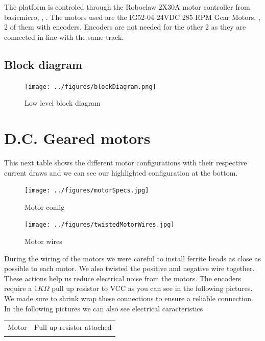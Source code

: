 \documentclass[12pt,letterpaper,oneside]{article}
\begin{document}
The platform is controled through the Roboclaw 2X30A motor controller from basicmicro, \cite{Roboclaw}, \cite{RoboclawData,RoboclawManual}. The motors used are the IG52-04 24VDC 285 RPM Gear Motors, \cite{EncMotors,RegMotors}, 2 of them with encoders. Encoders are not needed for the other 2 as they are connected in line with the same track.

\subsection{Block diagram}

\begin{figure}[h]
    \centering
    \texttt{[image: ../figures/blockDiagram.png]}
    \caption{Low level block diagram}
    \label{fig:blockl}
\end{figure}


\newpage
\section{D.C. Geared motors}

This next table shows the different motor configurations with their respective current draws and we can see our highlighted configuration at the bottom.

\begin{figure}[h]
    \centering
    \texttt{[image: ../figures/motorSpecs.jpg]}
    \caption{Motor config}
    \label{fig:motorConfig}
\end{figure}

\begin{figure}
  \begin{center}
    \texttt{[image: ../figures/twistedMotorWires.jpg]}
  \end{center}
  \caption{Motor wires}
\end{figure}

During the wiring of the motors we were careful to install ferrite beads as close as possible to each motor. We also twisted the positive and negative wire together. These actions help us reduce electrical noise from the motors. The encoders require a $1K\Omega$ pull up resistor to VCC as you can see in the following pictures. We made sure to shrink wrap these connections to ensure a reliable connection. In the following pictures we can also see electrical caracteristics

\begin{tabular}{ c c }
    Motor & Pull up resistor attached \\
     \raisebox{-\totalheight}{\texttt{[image: ../figures/motor.jpg]}} & \raisebox{-\totalheight}{\texttt{[image: ../figures/gearMotorPullUpBoard.jpg]}} \\
\end{tabular}
\end{document}

